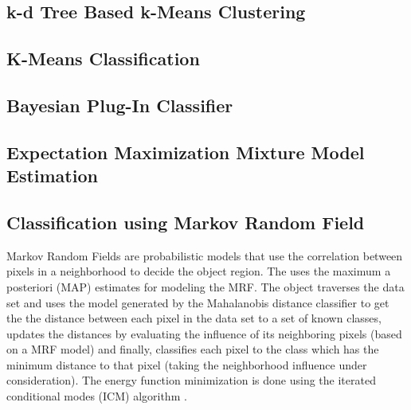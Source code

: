 \subsection{k-d Tree Based k-Means Clustering}
\label{sec:KdTreeBasedKMeansClustering}
\ifitkFullVersion

\fi

\subsection{K-Means Classification}
\label{sec:KMeansClassifier}
\ifitkFullVersion

\fi
\ifitkFullVersion

\fi

\subsection{Bayesian Plug-In Classifier}
\label{sec:BayesianPluginClassifier}

\ifitkFullVersion 

\fi


\subsection{Expectation Maximization Mixture Model Estimation}
\label{sec:ExpectationMaximizationMixtureModelEstimation}

\ifitkFullVersion 

\fi

\subsection{Classification using Markov Random Field}
\label{sec:MarkovRandomField}

Markov Random Fields are probabilistic models that use the correlation between
pixels in a neighborhood to decide the object region. The
 uses the maximum a posteriori (MAP)
estimates for modeling the MRF. The object traverses the data set and uses the
model generated by the Mahalanobis distance classifier to get the the distance
between each pixel in the data set to a set of known classes, updates the
distances by evaluating the influence of its neighboring pixels (based on a MRF
model) and finally, classifies each pixel to the class which has the minimum
distance to that pixel (taking the neighborhood influence under consideration).
The energy function minimization is done using the iterated conditional modes
(ICM) algorithm \cite{Besag1986}.

